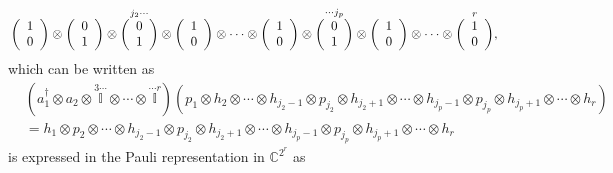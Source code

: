 \documentclass[aps,preprint]{revtex4}%
\begin{document}
\begin{align}
&  \left(
\begin{array}
[c]{c}%
1\\
0
\end{array}
\right)  \otimes\left(
\begin{array}
[c]{c}%
0\\
1
\end{array}
\right)  \otimes\overset{j_{2}\cdots}{\left(
\begin{array}
[c]{c}%
0\\
1
\end{array}
\right)  }\otimes\left(
\begin{array}
[c]{c}%
1\\
0
\end{array}
\right)  \otimes\cdots\otimes\left(
\begin{array}
[c]{c}%
1\\
0
\end{array}
\right)  \otimes\overset{\cdots j_{p}}{\left(
\begin{array}
[c]{c}%
0\\
1
\end{array}
\right)  }\otimes\left(
\begin{array}
[c]{c}%
1\\
0
\end{array}
\right)  \otimes\cdots\otimes\overset{r}{\left(
\begin{array}
[c]{c}%
1\\
0
\end{array}
\right)  },
\end{align}
which can be written as
\begin{align}
&  \left(  a_{1}^{\dagger}\otimes a_{2}\otimes\overset{3\cdots}{\mathbb{I}%
}\otimes\cdots\otimes\overset{\cdots r}{\mathbb{I}}\right)  \left(
p_{1}\otimes h_{2}\otimes\cdots\otimes h_{j_{2}-1}\otimes p_{j_{2}}\otimes
h_{j_{2}+1}\otimes\cdots\otimes h_{j_{p}-1}\otimes p_{j_{p}}\otimes
h_{j_{p}+1}\otimes\cdots\otimes h_{r}\right) \nonumber\\
&  =h_{1}\otimes p_{2}\otimes\cdots\otimes h_{j_{2}-1}\otimes p_{j_{2}}\otimes
h_{j_{2}+1}\otimes\cdots\otimes h_{j_{p}-1}\otimes p_{j_{p}}\otimes
h_{j_{p}+1}\otimes\cdots\otimes h_{r}%
\end{align}
is expressed in the Pauli representation in $\mathbb{C}^{2^{r}}$ as
\end{document}
